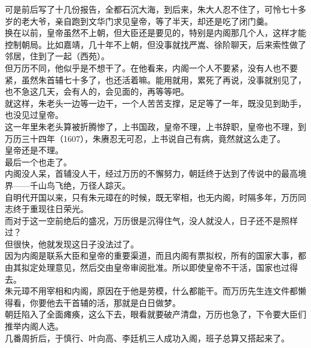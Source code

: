 \begin{multicols}{\theparacolNo}
可是前后写了十几份报告，全都石沉大海，到后来，朱大人忍不住了，可怜七十多岁的老大爷，亲自跑到文华门求见皇帝，等了半天，却还是吃了闭门羹。\\

换在以前，皇帝虽然不上朝，但大臣还是要见的，特别是内阁那几个人，这样才能控制朝局。比如嘉靖，几十年不上朝，但没事就找严嵩、徐阶聊天，后来索性做了邻居，住到了一起（西苑）。\\

但万历不同，他似乎是不想干了。在他看来，内阁一个人不要紧，没有人也不要紧，虽然朱首辅七十多了，也还活着嘛。能用就用，累死了再说，没事就别见了，也不急这几天，会有人的，会见面的，再等等吧。\\

就这样，朱老头一边等一边干，一个人苦苦支撑，足足等了一年，既没见到助手，也没见过皇帝。\\

这一年里朱老头算被折腾惨了，上书国政，皇帝不理，上书辞职，皇帝也不理，到万历三十四年（1607），朱赓忍无可忍，上书说自己有病，竟然就这么走了。\\

皇帝还是不理。\\

最后一个也走了。\\

内阁没人呆，首辅没人干，经过万历的不懈努力，朝廷终于达到了传说中的最高境界——千山鸟飞绝，万径人踪灭。\\

自明代开国以来，只有朱元璋在的时候，既无宰相，也无内阁，时隔多年，万历同志终于重现往日荣光。\\

而对于这一空前绝后的盛况，万历很是沉得住气，没人就没人，日子还不是照样过？\\

但很快，他就发现这日子没法过了。\\

因为内阁是联系大臣和皇帝的重要渠道，而且内阁有票拟权，所有的国家大事，都由其拟定处理意见，然后交由皇帝审阅批准。所以即使皇帝不干活，国家也过得去。\\

朱元璋不用宰相和内阁，原因在于他是劳模，什么都能干。而万历先生连文件都懒得看，你要他去干首辅的活，那就是白日做梦。\\

朝廷陷入了全面瘫痪，这么下去，眼看就要破产清盘，万历也急了，下令要大臣们推举内阁人选。\\

几番周折后，于慎行、叶向高、李廷机三人成功入阁，班子总算又搭起来了。\\


\end{multicols}
